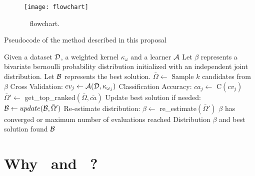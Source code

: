 \begin{figure}[ht]
	\centering
		\texttt{[image: flowchart]}
	\caption{\WKII~ flowchart.}
	\label{fig:im03}
\end{figure}

\begin{algorithm}[ht]
	\caption{\textsf{Pseudocode of the method described in this proposal}}
	\begin{algorithmic}
		\REQUIRE Given a dataset ${\cal D}$, a weighted kernel $\kappa_\omega$ and a learner ${\cal A}$
		\STATE Let $\beta$ represents a bivariate bernoulli probability distribution initialized with an independent joint distribution. Let ${\cal B}$ represents the best solution.
		\REPEAT 
			\STATE $\bar{\Omega} \gets$ Sample $k$ candidates from $\beta$ 
				\STATE Cross Validation: $cv_j \gets {\cal A} ({\cal D}, \kappa_{\omega_j})$
				\STATE Classification Accuracy: $ca_j \gets$ C\cA$(cv_j)$
			\ENDFOR
			\STATE $\bar{\Omega}' \gets$ get\_top\_ranked$(\bar{\Omega},\bar{ca})$
			\STATE Update best solution if needed:  ${\cal B} \gets update({\cal B},\bar{\Omega}')$
			\STATE Re-estimate distribution: $\beta \gets$ re\_estimate$(\bar{\Omega}')$
	\UNTIL $\beta$ has converged or maximum number of evaluations reached
	\RETURN Distribution $\beta$ and best solution found ${\cal B}$ 
	\end{algorithmic}
	\label{alg:idea}
\end{algorithm}

\section{Why \TILDA~and \GB~?}

